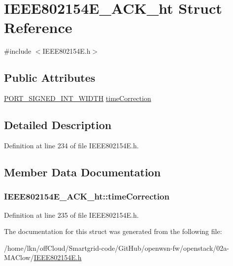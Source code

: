 \hypertarget{struct_i_e_e_e802154_e___a_c_k__ht}{}\section{I\+E\+E\+E802154\+E\+\_\+\+A\+C\+K\+\_\+ht Struct Reference}
\label{struct_i_e_e_e802154_e___a_c_k__ht}


{\ttfamily \#include $<$I\+E\+E\+E802154\+E.\+h$>$}

\subsection*{Public Attributes}
\begin{DoxyCompactItemize}
\item 
\hyperlink{z1_2board__info_8h_a07a9f9de95908017f808cbf0c474828e}{P\+O\+R\+T\+\_\+\+S\+I\+G\+N\+E\+D\+\_\+\+I\+N\+T\+\_\+\+W\+I\+D\+TH} \hyperlink{struct_i_e_e_e802154_e___a_c_k__ht_a12901da280b39ec6365a8cd577c5402c}{time\+Correction}
\end{DoxyCompactItemize}


\subsection{Detailed Description}


Definition at line 234 of file I\+E\+E\+E802154\+E.\+h.



\subsection{Member Data Documentation}
\subsubsection[{\texorpdfstring{time\+Correction}{timeCorrection}}]{ I\+E\+E\+E802154\+E\+\_\+\+A\+C\+K\+\_\+ht\+::time\+Correction}\hypertarget{struct_i_e_e_e802154_e___a_c_k__ht_a12901da280b39ec6365a8cd577c5402c}{}\label{struct_i_e_e_e802154_e___a_c_k__ht_a12901da280b39ec6365a8cd577c5402c}


Definition at line 235 of file I\+E\+E\+E802154\+E.\+h.



The documentation for this struct was generated from the following file\+:\begin{DoxyCompactItemize}
\item 
/home/lkn/off\+Cloud/\+Smartgrid-\/code/\+Git\+Hub/openwsn-\/fw/openstack/02a-\/\+M\+A\+Clow/\hyperlink{_i_e_e_e802154_e_8h}{I\+E\+E\+E802154\+E.\+h}\end{DoxyCompactItemize}
